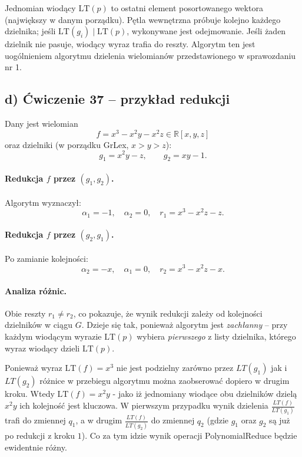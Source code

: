 \documentclass[12pt,a4paper]{article}
\begin{document}
	Jednomian wiodący $\mathrm{LT}(p)$ to ostatni element posortowanego wektora (największy
	w danym porządku). Pętla wewnętrzna próbuje kolejno każdego dzielnika; jeśli
	$\mathrm{LT}(g_i) \mid \mathrm{LT}(p)$, wykonywane jest odejmowanie. Jeśli żaden dzielnik
	nie pasuje, wiodący wyraz trafia do reszty. \newline
	Algorytm ten jest uogólnieniem algorytmu dzielenia wielomianów przedstawionego w sprawozdaniu nr 1.
	
	\subsection{d) Ćwiczenie 37 -- przykład redukcji}
	
	Dany jest wielomian
	\[
	f = x^3 - x^2 y - x^2 z \in \mathbb{R}[x,y,z]
	\]
	oraz dzielniki (w porządku GrLex, $x > y > z$):
	\[
	g_1 = x^2 y - z, \qquad g_2 = xy - 1.
	\]
	
	\paragraph{Redukcja $f$ przez $(g_1, g_2)$.}
	
	Algorytm wyznaczył:
	\[
	\alpha_1 = -1, \quad \alpha_2 = 0, \quad r_1 = x^3 - x^2z - z.
	\]

	
	\paragraph{Redukcja $f$ przez $(g_2, g_1)$.}
	
	Po zamianie kolejności:
	\[
	\alpha_2 = -x, \quad \alpha_1 = 0, \quad r_2 = x^3 - x^2z - x.
	\]
	
	\paragraph{Analiza różnic.}
	Obie reszty $r_1 \neq r_2$, co pokazuje, że wynik redukcji zależy od kolejności dzielników
	w ciągu $G$. Dzieje się tak, ponieważ algorytm jest \emph{zachłanny} -- przy każdym
	wiodącym wyrazie $\mathrm{LT}(p)$ wybiera \emph{pierwszego} z listy dzielnika, którego
	wyraz wiodący dzieli $\mathrm{LT}(p)$.
	
	Ponieważ wyraz  $\mathrm{LT}(f) = x^3$ nie jest podzielny zarówno przez $LT(g_1)$ jak  i $LT(g_2)$ różnice w przebiegu algorytmu można zaobserować dopiero w drugim kroku. \newline
	Wtedy $\mathrm{LT}(f) = x^2y$ - jako iż jednomiany wiodące obu dzielników dzielą $x^2y$ ich kolejność jest kluczowa. W pierwszym przypadku wynik dzielenia $\frac{LT(f)}{LT(g_1)}$ trafi do zmiennej $q_1$, a w drugim $\frac{LT(f)}{LT(g_2)}$ do zmiennej $q_2$ (gdzie $g_1$ oraz $g_2$ są już po redukcji z kroku $1$). Co za tym idzie wynik operacji PolynomialReduce będzie ewidentnie różny.
	
\end{document}
